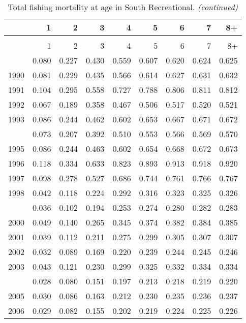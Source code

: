 \documentclass[
]{article}
\begin{document}
\begin{longtable}[t]{lrrrrrrrr}
\caption{\label{tab:South_Recreational-fleet-FAA-table}Total fishing mortality at age in South Recreational.}\\
\toprule
  & 1 & 2 & 3 & 4 & 5 & 6 & 7 & 8+\\
\midrule
\endfirsthead
\caption[]{Total fishing mortality at age in South Recreational. \textit{(continued)}}\\
\toprule
  & 1 & 2 & 3 & 4 & 5 & 6 & 7 & 8+\\
\midrule
\endhead

\endfoot
\bottomrule
\endlastfoot
1989 & 0.080 & 0.227 & 0.430 & 0.559 & 0.607 & 0.620 & 0.624 & 0.625\\
1990 & 0.081 & 0.229 & 0.435 & 0.566 & 0.614 & 0.627 & 0.631 & 0.632\\
1991 & 0.104 & 0.295 & 0.558 & 0.727 & 0.788 & 0.806 & 0.811 & 0.812\\
1992 & 0.067 & 0.189 & 0.358 & 0.467 & 0.506 & 0.517 & 0.520 & 0.521\\
1993 & 0.086 & 0.244 & 0.462 & 0.602 & 0.653 & 0.667 & 0.671 & 0.672\\
\addlinespace
1994 & 0.073 & 0.207 & 0.392 & 0.510 & 0.553 & 0.566 & 0.569 & 0.570\\
1995 & 0.086 & 0.244 & 0.463 & 0.602 & 0.654 & 0.668 & 0.672 & 0.673\\
1996 & 0.118 & 0.334 & 0.633 & 0.823 & 0.893 & 0.913 & 0.918 & 0.920\\
1997 & 0.098 & 0.278 & 0.527 & 0.686 & 0.744 & 0.761 & 0.766 & 0.767\\
1998 & 0.042 & 0.118 & 0.224 & 0.292 & 0.316 & 0.323 & 0.325 & 0.326\\
\addlinespace
1999 & 0.036 & 0.102 & 0.194 & 0.253 & 0.274 & 0.280 & 0.282 & 0.283\\
2000 & 0.049 & 0.140 & 0.265 & 0.345 & 0.374 & 0.382 & 0.384 & 0.385\\
2001 & 0.039 & 0.112 & 0.211 & 0.275 & 0.299 & 0.305 & 0.307 & 0.307\\
2002 & 0.032 & 0.089 & 0.169 & 0.220 & 0.239 & 0.244 & 0.245 & 0.246\\
2003 & 0.043 & 0.121 & 0.230 & 0.299 & 0.325 & 0.332 & 0.334 & 0.334\\
\addlinespace
2004 & 0.028 & 0.080 & 0.151 & 0.197 & 0.213 & 0.218 & 0.219 & 0.220\\
2005 & 0.030 & 0.086 & 0.163 & 0.212 & 0.230 & 0.235 & 0.236 & 0.237\\
2006 & 0.029 & 0.082 & 0.155 & 0.202 & 0.219 & 0.224 & 0.225 & 0.226\\

\end{longtable}
\end{document}

